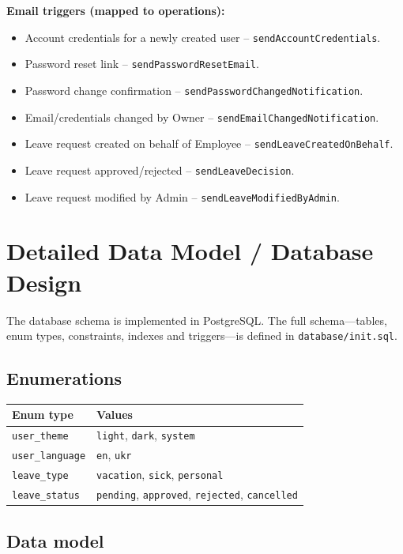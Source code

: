 \documentclass[11pt,a4paper]{article}
\begin{document}
\textbf{Email triggers (mapped to operations):}
\begin{itemize}[leftmargin=1.5em]
    \item Account credentials for a newly created user -- \texttt{sendAccountCredentials}.
    \item Password reset link -- \texttt{sendPasswordResetEmail}.
    \item Password change confirmation -- \texttt{sendPasswordChangedNotification}.
    \item Email/credentials changed by Owner -- \texttt{sendEmailChangedNotification}.
    \item Leave request created on behalf of Employee -- \texttt{sendLeaveCreatedOnBehalf}.
    \item Leave request approved/rejected -- \texttt{sendLeaveDecision}.
    \item Leave request modified by Admin -- \texttt{sendLeaveModifiedByAdmin}.
\end{itemize}

\section{Detailed Data Model / Database Design}
\label{sec:datamodel}

The database schema is implemented in PostgreSQL. The full schema---tables, enum types, constraints, indexes and triggers---is defined in \texttt{database/init.sql}.

\subsection{Enumerations}

\begin{longtable}{p{3.5cm} p{10cm}}
\toprule
\textbf{Enum type} & \textbf{Values} \\
\midrule
\texttt{user\_theme} & \texttt{light}, \texttt{dark}, \texttt{system} \\
\texttt{user\_language} & \texttt{en}, \texttt{ukr} \\
\texttt{leave\_type} & \texttt{vacation}, \texttt{sick}, \texttt{personal} \\
\texttt{leave\_status} & \texttt{pending}, \texttt{approved}, \texttt{rejected}, \texttt{cancelled} \\
\bottomrule
\end{longtable}

\subsection{Data model}
\end{document}
